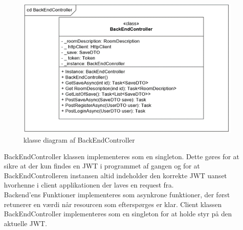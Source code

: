 \begin{figure}[H]
\centering
\includegraphics[width = \textwidth]{02-Body/Images/Backend_klasse_BackEndController.PNG}
\caption{klasse diagram af BackEndController}
\label{fig:Implementering-Backend-Klasse-BackEndController}
\end{figure}

BackEndController klassen implementeres som en singleton. Dette gøres for at sikre at der kun findes en JWT i programmet af gangen og for at BackEndControlleren instansen altid indeholder den korrekte JWT uanset hvorhenne i client applikationen der laves en request fra.\\

Backend'ens Funktioner implementeres som asynkrone funktioner, der først retunerer en værdi når resourcen som efterspørges er klar. Client klassen BackEndController implementeres som en singleton for at holde styr på den aktuelle JWT.

\newpage
